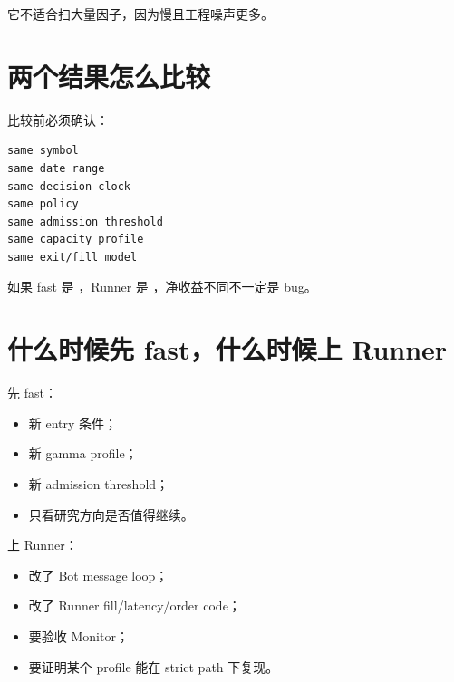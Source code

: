 它不适合扫大量因子，因为慢且工程噪声更多。

\section{两个结果怎么比较}

比较前必须确认：

\begin{lstlisting}
same symbol
same date range
same decision clock
same policy
same admission threshold
same capacity profile
same exit/fill model
\end{lstlisting}

如果 fast 是 ，Runner 是 ，净收益不同不一定是 bug。

\section{什么时候先 fast，什么时候上 Runner}

先 fast：

\begin{itemize}[leftmargin=2em]
  \item 新 entry 条件；
  \item 新 gamma profile；
  \item 新 admission threshold；
  \item 只看研究方向是否值得继续。
\end{itemize}

上 Runner：

\begin{itemize}[leftmargin=2em]
  \item 改了 Bot message loop；
  \item 改了 Runner fill/latency/order code；
  \item 要验收 Monitor；
  \item 要证明某个 profile 能在 strict path 下复现。
\end{itemize}


